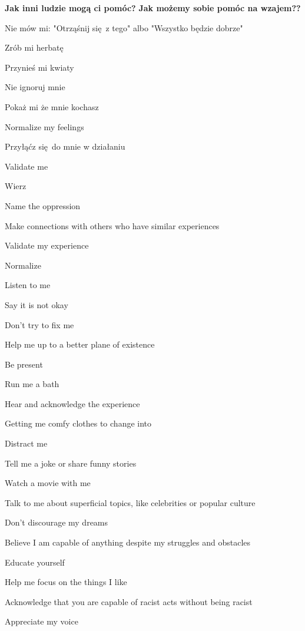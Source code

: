 \noindent\textcolor{ProcessBlue}{\textbf{\Large{Jak inni ludzie mogą ci pomóc?}}}
\noindent\textcolor{ProcessBlue}{\textbf{\Large{Jak możemy sobie pomóc na wzajem??}}}\\
\begin{multicols}{2}
\begin{checkboxlist}
\item Nie mów mi: "Otrząśnij się z tego" albo "Wszystko będzie dobrze"
\item Zrób mi herbatę
\item Przynieś mi kwiaty
\item Nie ignoruj mnie
\item Pokaż mi że mnie kochasz
\item Normalize my feelings
\item Przyłąćz się do mnie w działaniu
\item Validate me
\item Wierz
\item Name the oppression
\item Make connections with others who have similar experiences
\item Validate my experience
\item Normalize
\item Listen to me
\item Say it is not okay
\item Don’t try to fix me
\item Help me up to a better plane of existence
\item Be present
\item Run me a bath
\item Hear and acknowledge the experience
\item Getting me comfy clothes to change into
\item Distract me
\item Tell me a joke or share funny stories
\item Watch a movie with me
\item Talk to me about superficial topics, like celebrities or popular culture
\item Don’t discourage my dreams
\item Believe I am capable of anything despite my struggles and obstacles
\item Educate yourself
\item Help me focus on the things I like
\item Acknowledge that you are capable of racist acts without being racist
\item Appreciate my voice

\end{checkboxlist}
\end{multicols}
